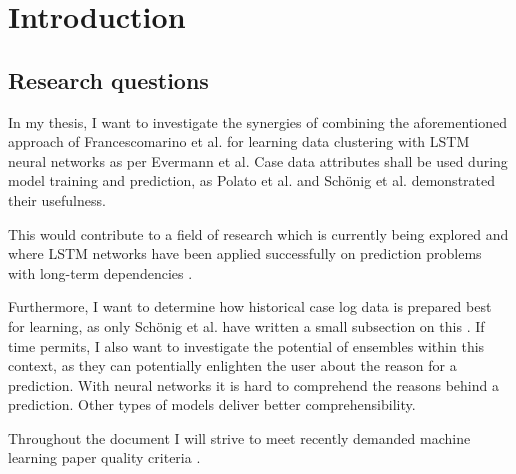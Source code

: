 \chapter{Introduction}\label{sec:intro}

\lipsum[1-4]

\section{Research questions}\label{sec:intro:objective}

In my thesis, I want to investigate the synergies of combining the aforementioned approach of Francescomarino et al. for learning data clustering with LSTM neural networks as per Evermann et al. Case data attributes shall be used during model training and prediction, as Polato et al. \cite{polato2014} and Schönig et al. \cite{schoenig2018} demonstrated their usefulness.

This would contribute to a field of research which is currently being explored and where LSTM networks have been applied successfully on prediction problems with long-term dependencies \cite{evermann2016, tax2017, schoenig2018, graves2005}.

Furthermore, I want to determine how historical case log data is prepared best for learning, as only Schönig et al. have written a small subsection on this \cite{schoenig2018}.
If time permits, I also want to investigate the potential of ensembles within this context, as they can potentially enlighten the user about the reason for a prediction.
With neural networks it is hard to comprehend the reasons behind a prediction.
Other types of models deliver better comprehensibility.

Throughout the document I will strive to meet recently demanded machine learning paper quality criteria \cite{lipton2018}.

